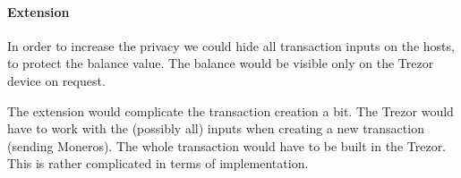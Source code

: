 \documentclass[]{article}
\begin{document}
\paragraph{Extension} In order to increase the privacy we could hide 
all transaction inputs on the hosts, to protect the balance value. The balance would be visible only on the Trezor device on request.

The extension would complicate the transaction creation a bit. The Trezor would have to work with the (possibly all) inputs when creating a new transaction (sending Moneros). The whole transaction would have to be built in the Trezor. This is rather complicated in terms of implementation. 

 





{}

\end{document}
